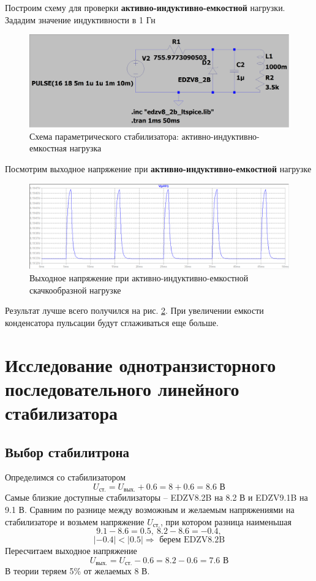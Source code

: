 \documentclass[a4paper, 12pt]{article}
\begin{document}
    \noindent Построим схему для проверки \textbf{активно-индуктивно-емкостной} нагрузки. Зададим
    значение индуктивности в 1 Гн
    \begin{figure}[H]
        \centering
        \includegraphics[scale=0.22]{1task_scheme_ALC.png}
        \captionsetup{skip=0pt}
        \caption{Схема параметрического стабилизатора: активно-индуктивно-емкостная нагрузка}
        \label{fig:1task_scheme_ALC}
    \end{figure}
    \noindent Посмотрим выходное напряжение при \textbf{активно-индуктивно-емкостной} нагрузке
    \begin{figure}[H]
        \centering
        \includegraphics[scale=0.46]{1task_rect_ALC.png}
        \captionsetup{skip=0pt}
        \caption{Выходное напряжение при активно-индуктивно-емкостной скачкообразной нагрузке}
        \label{fig:1task_rect_ALC}
    \end{figure}
    \noindent Результат лучше всего получился на рис. \ref{fig:1task_rect_ALC}. При увеличении
    емкости конденсатора пульсации будут сглаживаться еще больше.


    \section{Исследование однотранзисторного последовательного линейного стабилизатора}
    \subsection{Выбор стабилитрона}
    Определимся со стабилизатором
    $$
    U_{\text{ст.}}=U_{\text{вых.}}+0.6=8+0.6=8.6\text{ В}
    $$
    Самые близкие доступные стабилизаторы -- EDZV8.2B на 8.2 В и EDZV9.1B на 9.1 В.
    Сравним по разнице между возможным и желаемым напряжениями на стабилизаторе и возьмем
    напряжение $U_{\text{ст.}}$, при котором разница наименьшая
    $$
    9.1-8.6=0.5,\ 8.2-8.6=-0.4,
    $$
    $$
    |-0.4|<|0.5|\Rightarrow\text{ берем EDZV8.2B}
    $$
    Пересчитаем выходное напряжение
    $$
    U_{\text{вых.}}=U_{\text{ст.}}-0.6=8.2-0.6=7.6\text{ В}
    $$
    В теории теряем 5\% от желаемых 8 В.
    
\end{document}
